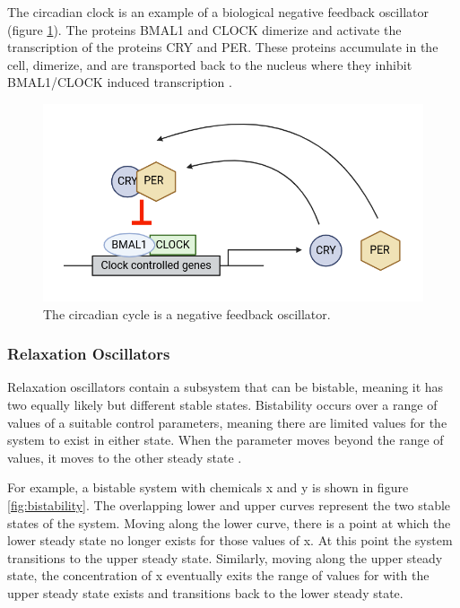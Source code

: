\documentclass[12pt]{report}
\begin{document}
The circadian clock is an example of a biological negative feedback oscillator (figure \ref{fig:circadian}). The proteins BMAL1 and CLOCK dimerize and activate the transcription of the proteins CRY and PER. These proteins accumulate in the cell, dimerize, and are transported back to the nucleus where they inhibit BMAL1/CLOCK induced transcription \cite{Rossetti2012}.

\begin{figure}
    \centering
    \includegraphics[width=12cm]{images/circadian.png}
    \caption[Negative feedback oscillation of the circadian cycle]{The circadian cycle is a negative feedback oscillator.}
    \label{fig:circadian}
\end{figure}

\subsubsection{Relaxation Oscillators}
Relaxation oscillators contain a subsystem that can be bistable, meaning it has two equally likely but different stable states. Bistability occurs over a range of values of a suitable control parameters, meaning there are limited values for the system to exist in either state. When the parameter moves beyond the range of values, it moves to the other steady state \cite{Sharma2006}.

For example, a bistable system with chemicals x and y is shown in figure \ref{fig:bistability}. The overlapping lower and upper curves represent the two stable states of the system. Moving along the lower curve, there is a point at which the lower steady state no longer exists for those values of x. At this point the system transitions to the upper steady state. Similarly, moving along the upper steady state, the concentration of x eventually exits the range of values for with the upper steady state exists and transitions back to the lower steady state.
\end{document}
